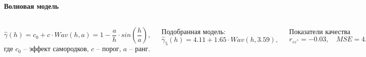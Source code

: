 \documentclass[notheorems]{beamer}
\theoremstyle{definition}
\theoremstyle{example}
\theoremstyle{plain}
\begin{document}
\begin{frame}
  \frametitle{\large\secname}
  \framesubtitle{Волновая модель}
  \begin{columns}[c]
  \column{3in}
  \begin{equation}
  \label{eq:wave}
    \widehat{\gamma}(h) = c_0 + c \cdot Wav(h, a) = 1 - \frac{a}{h} \cdot sin(\frac{h}{a}),
  \end{equation}
  где $ c_0 $ -- эффект самородков, $ c $ -- порог, $ a $ -- ранг.

  \vspace{0.5em}

  Подобранная модель:
  \begin{equation}
  \label{eq:gamma9}
    \widehat{\gamma}_5(h) = 4.11 + 1.65 \cdot Wav(h, 3.59),
  \end{equation}

  Показатели качества
  \begin{equation*}
    r_{\varepsilon\varepsilon^{*}} = -0.03, \quad MSE = 4.20
  \end{equation*}

  \column{3in}
  \vspace{-14.5pt}
  \begin{figure}[H]
    \includegraphics[width=0.9\linewidth]{../../figures/variogram/auto-rob-5-modeled.png} \\
    \caption{Модель семивариограммы $\widehat{\gamma}_6(h)$}
    \includegraphics[width=0.9\linewidth]{../../figures/variogram/auto-rob-5-cross-prediction.png}
    \caption{Прогноз по модели $\widehat{\gamma}_6(h)$}
  \end{figure}
  \end{columns}
\end{frame}
\end{document}
